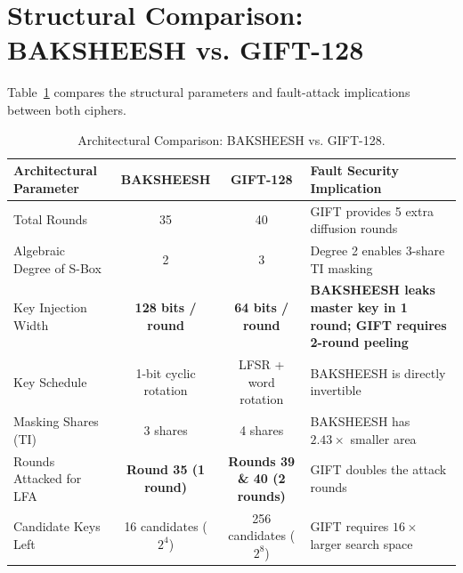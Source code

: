\section{Structural Comparison: BAKSHEESH vs. GIFT-128}
\label{sec:cipher_comparison}
Table~\ref{tab:cipher_comparison} compares the structural parameters and fault-attack implications between both ciphers.

\begin{table}[!htbp]
\centering
\caption{Architectural Comparison: BAKSHEESH vs. GIFT-128.}
\label{tab:cipher_comparison}
\begin{tabular}{lccp{5.5cm}}
\toprule
\textbf{Architectural Parameter} & \textbf{BAKSHEESH} & \textbf{GIFT-128} & \textbf{Fault Security Implication} \\
\midrule
Total Rounds & 35 & 40 & GIFT provides 5 extra diffusion rounds \\
Algebraic Degree of S-Box & 2 & 3 & Degree 2 enables 3-share TI masking \\
Key Injection Width & \textbf{128 bits / round} & \textbf{64 bits / round} & \textbf{BAKSHEESH leaks master key in 1 round; GIFT requires 2-round peeling} \\
Key Schedule & 1-bit cyclic rotation & LFSR + word rotation & BAKSHEESH is directly invertible \\
Masking Shares (TI) & 3 shares & 4 shares & BAKSHEESH has $2.43\times$ smaller area \\
Rounds Attacked for LFA & \textbf{Round 35 (1 round)} & \textbf{Rounds 39 \& 40 (2 rounds)} & GIFT doubles the attack rounds \\
Candidate Keys Left & 16 candidates ($2^4$) & 256 candidates ($2^8$) & GIFT requires $16\times$ larger search space \\
\bottomrule
\end{tabular}
\end{table}
